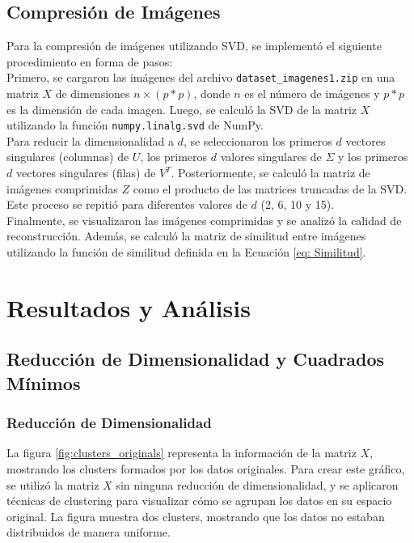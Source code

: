 \documentclass[12pt,a4]{article} %
\begin{document}
\subsection{Compresión de Imágenes}
Para la compresión de imágenes utilizando SVD, se implementó el siguiente procedimiento en forma de pasos:
\\

Primero, se cargaron las imágenes del archivo \texttt{dataset\_imagenes1.zip} en una matriz $X$ de dimensiones $n \times (p * p)$, donde $n$ es el número de imágenes y $p * p$ es la dimensión de cada imagen. Luego, se calculó la SVD de la matriz $X$ utilizando la función \texttt{numpy.linalg.svd} de NumPy.
\\

Para reducir la dimensionalidad a $d$, se seleccionaron los primeros $d$ vectores singulares (columnas) de $U$, los primeros $d$ valores singulares de $\Sigma$ y los primeros $d$ vectores singulares (filas) de $V^T$. Posteriormente, se calculó la matriz de imágenes comprimidas $Z$ como el producto de las matrices truncadas de la SVD. Este proceso se repitió para diferentes valores de $d$ (2, 6, 10 y 15).
\\

Finalmente, se visualizaron las imágenes comprimidas y se analizó la calidad de reconstrucción. Además, se calculó la matriz de similitud entre imágenes utilizando la función de similitud definida en la Ecuación \ref{eq: Similitud}.


\section{Resultados y Análisis}
\subsection{Reducción de Dimensionalidad y Cuadrados Mínimos}
\subsubsection{Reducción de Dimensionalidad}

La figura \ref{fig:clusters_originals} representa la información de la matriz $X$, mostrando los clusters formados por los datos originales. Para crear este gráfico, se utilizó la matriz $X$ sin ninguna reducción de dimensionalidad, y se aplicaron técnicas de clustering para visualizar cómo se agrupan los datos en su espacio original. La figura muestra dos clusters, mostrando que los datos no estaban distribuidos de manera uniforme.
\end{document}
